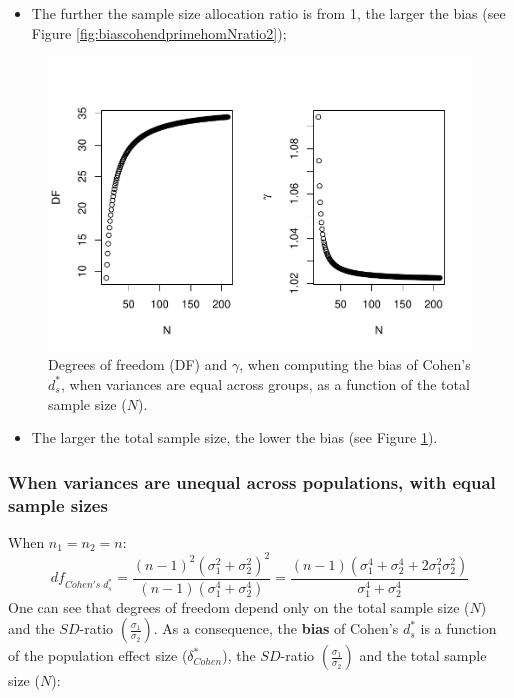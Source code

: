 \documentclass[
  english,
  man]{apa6}
\providecommand{\tightlist}{%
  \setlength{\itemsep}{0pt}\setlength{\parskip}{0pt}}
\begin{document}
\begin{itemize}
\tightlist
\item
  The further the sample size allocation ratio is from 1, the larger the bias (see Figure \ref{fig:biascohendprimehomNratio2});
\end{itemize}

\begin{figure}
\centering
\includegraphics{Theoretical-Bias-of-all-estimators-as-a-function-of-population-parameters_files/figure-latex/biascohendprimehomNsize2-1.pdf}
\caption{\label{fig:biascohendprimehomNsize2}Degrees of freedom (DF) and \(\gamma\), when computing the bias of Cohen's \(d^*_s\), when variances are equal across groups, as a function of the total sample size (\(N\)).}
\end{figure}

\begin{itemize}
\tightlist
\item
  The larger the total sample size, the lower the bias (see Figure \ref{fig:biascohendprimehomNsize2}).
\end{itemize}

\hypertarget{when-variances-are-unequal-across-populations-with-equal-sample-sizes}{%
\subsubsection{When variances are unequal across populations, with equal sample sizes}\label{when-variances-are-unequal-across-populations-with-equal-sample-sizes}}

When \(n_1=n_2=n\):
\[df_{Cohen's \; d^*_s} = \frac{(n-1)^2(\sigma^2_1+\sigma^2_2)^2}{(n-1)(\sigma^4_1+\sigma^4_2)} =  \frac{(n-1)(\sigma^4_1+\sigma^4_2+2\sigma^2_1\sigma^2_2)}{\sigma^4_1+\sigma^4_2}\]
One can see that degrees of freedom depend only on the total sample size (\(N\)) and the \(SD\)-ratio \(\left( \frac{\sigma_1}{\sigma_2}\right)\). As a consequence, the \textbf{bias} of Cohen's \(d^*_s\) is a function of the population effect size (\(\delta^*_{Cohen}\)), the \(SD\)-ratio \(\left( \frac{\sigma_1}{\sigma_2}\right)\) and the total sample size (\(N\)):
\end{document}
